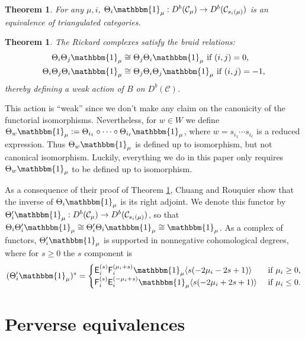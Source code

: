 \documentclass[11pt,reqno]{amsart}
\numberwithin{equation}{section}
\newtheorem{Theorem}[equation]{Theorem}
\theoremstyle{definition}
\theoremstyle{named}
\newcommand{\cC}{\mathcal{C}}
\newcommand{\sE}{\mathsf{E}}
\newcommand{\sF}{\mathsf{F}}
\newcommand{\bone}{\mathbbm{1}}
\begin{document}
\begin{Theorem}\cite[Theorem 6.4]{CR}\label{thm:CR}
For any $\mu,i$, $\Theta_i\bone_\mu:D^b(\cC_\mu)\to D^b(\cC_{s_i(\mu)})$ is an equivalence of triangulated categories.
\end{Theorem}

\begin{Theorem}\cite[Theorem 6.3]{CK3}\label{thm:CK}
The Rickard complexes satisfy the braid relations:
\begin{align*}
\Theta_i\Theta_j\bone_\mu &\cong \Theta_j\Theta_i\bone_\mu \text{ if } (i,j)=0,\\
\Theta_i\Theta_j\Theta_i\bone_\mu &\cong \Theta_j\Theta_i\Theta_j\bone_\mu \text{ if } (i,j)=-1,
\end{align*}
thereby defining a weak action of $B$ on $D^b(\cC)$.
\end{Theorem}

This action is ``weak'' since we don't make any claim on the canonicity of the functorial isomorphisms.  Nevertheless, for $w \in W$ we define $\Theta_w\bone_\mu := \Theta_{i_1}\circ\cdots\circ\Theta_{i_\ell}\bone_\mu$, where $w=s_{i_1}\cdots s_{i_\ell}$ is a reduced expression.  Thus  $\Theta_w\bone_\mu$ is defined up to isomorphism, but not canonical isomorphism.  Luckily, everything we do in this paper only requires $\Theta_w\bone_\mu$ to be defined up to isomorphism.


As a consequence of their proof of Theorem \ref{thm:CR}, Chuang and Rouquier show that the inverse  of $\Theta_i\bone_\mu$ is its right adjoint.  We denote this functor by $\Theta_i'\bone_{\mu}:D^b(\cC_\mu)\to D^b(\cC_{s_i(\mu)})$, so that $\Theta_i\Theta_i'\bone_\mu \cong \Theta'_i\Theta_i\bone_\mu \cong \bone_\mu$.  As a complex of functors, $\Theta_i'\bone_\mu$ is supported in nonnegative cohomological degrees, where for $s\geq0$ the $s$ component is
\begin{align*}
(\Theta_i'\bone_\mu)^s =\begin{cases}
\sE_i^{(s)}\sF_i^{(\mu_i+s)}\bone_\mu\langle s(-2\mu_i-2s+1) \rangle &\text{ if } \mu_i \geq 0, \\
\sF_i^{(s)}\sE_i^{(-\mu_i+s)}\bone_\mu\langle s(-2\mu_i+2s+1) \rangle&\text{ if } \mu_i \leq 0.
\end{cases}
\end{align*}

\section{Perverse equivalences}
\end{document}
